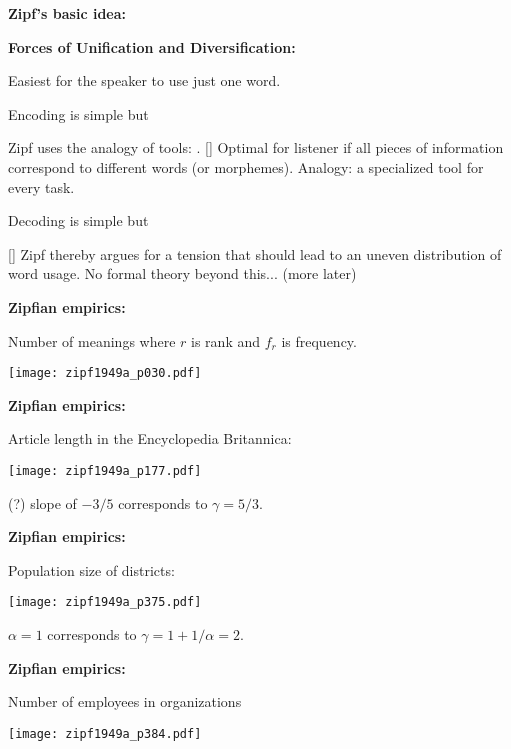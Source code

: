   \textbf{Zipf's basic idea:}

  \textbf{Forces of Unification and Diversification:}
  
   Easiest for the speaker to use just one word.
    
     {\alert{Encoding is simple} but }
    
   Zipf uses the analogy of tools: .
  []
   Optimal for listener if all pieces of information
    correspond to different words (or morphemes).
   Analogy: a specialized tool for every task.
    
     {\alert{Decoding is simple} but }
    
  []
   Zipf thereby argues for a tension that should lead
    to an uneven distribution of word usage.
   No formal theory beyond this...
    (more later\cite{ferrericancho2003a})
  
  



  \textbf{Zipfian empirics:}
  
  
   Number of meanings  where
    $r$ is rank and $f_r$ is frequency.
  

  \centering
  \texttt{[image: zipf1949a\_p030.pdf]}


  \textbf{Zipfian empirics:}

  
   Article length in the Encyclopedia Britannica:
  
  \centering
  \texttt{[image: zipf1949a\_p177.pdf]}
  
   (?) slope of $-3/5$ corresponds to $\gamma=5/3$.
  




  \textbf{Zipfian empirics:}

  
   Population size of districts:
  
  \centering
  \texttt{[image: zipf1949a\_p375.pdf]}
  
   $\alpha=1$ corresponds to $\gamma=1+1/\alpha=2$.
  


  \textbf{Zipfian empirics:}

  
   Number of employees in organizations
  
  \begin{center}
    \texttt{[image: zipf1949a\_p384.pdf]}
  \end{center}
  
